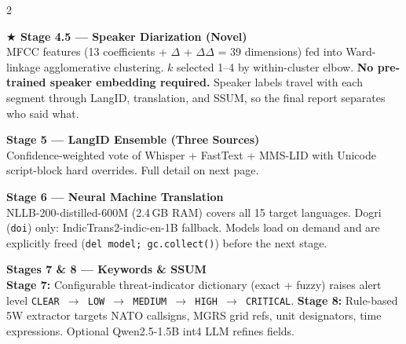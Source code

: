 \documentclass[11pt,a4paper]{article}
\begin{document}
\begin{multicols}{2}
\vspace{4pt}

\begin{stageorange}
\textbf{\color{DOrange}$\bigstar$ Stage 4.5 --- Speaker Diarization (Novel)}\\
\small MFCC features (13 coefficients + $\Delta$ + $\Delta\Delta$ = 39 dimensions) fed into Ward-linkage agglomerative clustering. $k$ selected 1--4 by within-cluster elbow. \textbf{No pre-trained speaker embedding required.} Speaker labels travel with each segment through LangID, translation, and SSUM, so the final report separates who said what.
\end{stageorange}

\vspace{4pt}

\begin{stageblue}
\textbf{\color{Royal}Stage 5 --- LangID Ensemble (Three Sources)}\\
\small Confidence-weighted vote of Whisper + FastText + MMS-LID with Unicode script-block hard overrides. Full detail on next page.
\end{stageblue}

\vspace{4pt}

\begin{stageblue}
\textbf{\color{Royal}Stage 6 --- Neural Machine Translation}\\
\small NLLB-200-distilled-600M (2.4\,GB RAM) covers all 15 target languages. Dogri (\texttt{doi}) only: IndicTrans2-indic-en-1B fallback. Models load on demand and are explicitly freed (\texttt{del model; gc.collect()}) before the next stage.
\end{stageblue}

\vspace{4pt}

\begin{stageblue}
\textbf{\color{Royal}Stages 7 \& 8 --- Keywords \& SSUM}\\
\small \textbf{Stage 7:} Configurable threat-indicator dictionary (exact + fuzzy) raises alert level \texttt{CLEAR $\to$ LOW $\to$ MEDIUM $\to$ HIGH $\to$ CRITICAL}. \textbf{Stage 8:} Rule-based 5W extractor targets NATO callsigns, MGRS grid refs, unit designators, time expressions. Optional Qwen2.5-1.5B int4 LLM refines fields.
\end{stageblue}

\end{multicols}

\vspace{4pt}
\end{document}
